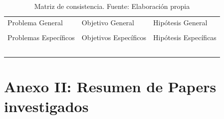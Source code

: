\begin{table}[h!]
	\centering
	\small
	\begin{tabular}{ |m{5cm}|m{5cm}|m{5cm}|  }
		\hline
		\rowcolor{bluejean}
		\Centering \color{white}{PROBLEMAS}& \Centering \color{white}{OBJETIVOS}& \Centering \color{white}{HIPÓTESIS}\\
		\hline
		\rowcolor{turq}
		\Centering Problema General& \Centering Objetivo General & \Centering Hipótesis General \\
		\hline
		{\ProblemaGeneral} & { \ObjetivoGeneral} & {\HipotesisGeneral} \\
		\hline
		\rowcolor{turq}
		\Centering Problemas Específicos& \Centering Objetivos Específicos & \Centering Hipótesis Específicas \\
		\hline
		{\Pbone} & {\Objone} & {\Hone} \\
		\hline
		{\Pbtwo} & {\Objtwo} & {\Htwo} \\
		\hline
		{\Pbthree} & {\Objthree} & {\Hthree} \\
		\hline
		{\Pbfour} & {\Objfour} & {\Hfour} \\
		\hline
		{\Pbfive} & {\Objfive} & {\Hfive} \\
		\hline
	\end{tabular}
	\caption{Matriz de consistencia. Fuente: Elaboración propia}
	\label{1:table}
\end{table}



\chapter{Anexo II: Resumen de Papers investigados}

